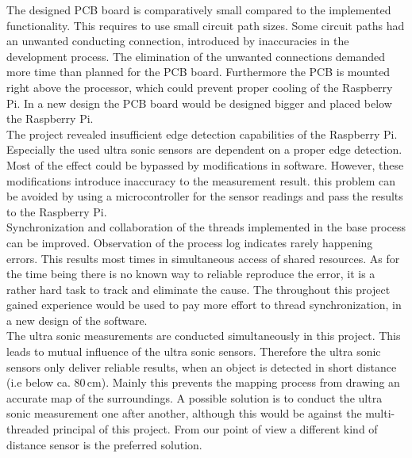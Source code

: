 The designed PCB board is comparatively small compared to the implemented functionality. This requires to use small circuit path sizes. Some circuit paths had an unwanted conducting connection, introduced by inaccuracies in the development process. The elimination of the unwanted connections demanded more time than planned for the PCB board. Furthermore the PCB is mounted right above the processor, which could prevent proper cooling of the Raspberry Pi. In a new design the PCB board would be designed bigger and placed below the Raspberry Pi.\\

The project revealed insufficient edge detection capabilities of the Raspberry Pi. Especially the used ultra sonic sensors are dependent on a proper edge detection. Most of the effect could be bypassed by modifications in software. However, these modifications introduce inaccuracy to the measurement result. this problem can be avoided by using a microcontroller for the sensor readings and pass the results to the Raspberry Pi.\\

Synchronization and collaboration of the threads implemented in the base process can be improved. Observation of the process log indicates rarely happening errors. This results most times in simultaneous access of shared resources. As for the time being there is no known way to reliable reproduce the error, it is a rather hard task to track and eliminate the cause. The throughout this project gained experience would be used to pay more effort to thread synchronization, in a new design of the software.\\

The ultra sonic measurements are conducted simultaneously in this project. This leads to mutual influence of the ultra sonic sensors. Therefore the ultra sonic sensors only deliver reliable results, when an object is detected in short distance (i.e below ca. 80\,cm). Mainly this prevents the mapping process from drawing an accurate map of the surroundings. A possible solution is to conduct the ultra sonic measurement one after another, although this would be against the multi-threaded principal of this project. From our point of view a different kind of distance sensor is the preferred solution.
